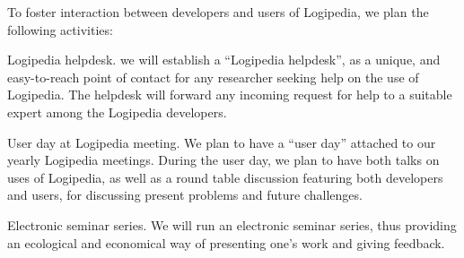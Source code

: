 \begin{workpackage}[id=dissemination,type=MGT,
  short={Dissemination},
  title={Dissemination, communication and exploitation},
  lead=Inr,InrRM=12,BirRM=4,IrtRM=4,ImtRM=2,StrRM=2,ZibRM=14,EduRM=12]
\begin{tasklist}
  \begin{task}[id=researchers-club,
      title=Expanding the use of Logipedia in research,
      lead=Bir,BirRM=2,wphases=7-42!.05]
     To foster interaction between developers and users of Logipedia, we plan the following activities:
    \begin{compactitem}
     \item Logipedia helpdesk.
    we will establish a ``Logipedia helpdesk'', as a unique, and easy-to-reach point of contact for any researcher seeking help on the use of Logipedia.
     The helpdesk will forward any incoming request for help to a suitable expert among the Logipedia developers.
     \item User day at Logipedia meeting.
     We plan to have a ``user day'' attached to our yearly Logipedia meetings.
     During the user day, we plan to have both talks on uses of Logipedia, as well as a round table discussion featuring both developers and users, for discussing present problems and future challenges.
     \item Electronic seminar series.
     We will run an electronic seminar series, thus providing an ecological and economical way of presenting one's work and giving feedback.
    \end{compactitem}
%


\end{task}
\end{tasklist}
\end{workpackage}
